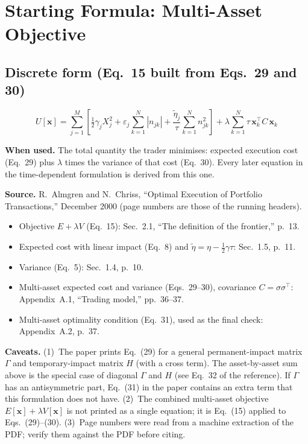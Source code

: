 \documentclass[11pt,a4paper]{article}
\begin{document}
    \section{Starting Formula: Multi-Asset Objective}

    \subsection*{Discrete form (Eq.~15 built from Eqs.~29 and 30)}

    \begin{equation}
    U[\mathbf{x}]
    = \sum_{j=1}^{M}\left[
        \tfrac{1}{2}\gamma_j X_j^2
        + \varepsilon_j \sum_{k=1}^{N}|n_{jk}|
        + \frac{\tilde{\eta}_j}{\tau}\sum_{k=1}^{N} n_{jk}^2
        \right]
    + \lambda \sum_{k=1}^{N} \tau\,\mathbf{x}_k^\top C\,\mathbf{x}_k
    \end{equation}

    \textbf{When used.} The total quantity the trader minimises: expected execution
    cost (Eq.~29) plus $\lambda$ times the variance of that cost (Eq.~30). Every later
    equation in the time-dependent formulation is derived from this one.

    \textbf{Source.} R.~Almgren and N.~Chriss, ``Optimal Execution of Portfolio
    Transactions,'' December 2000 (page numbers are those of the running headers).
    \begin{itemize}[leftmargin=1.5em,nosep]
    \item Objective $E+\lambda V$ (Eq.~15): Sec.~2.1, ``The definition of the frontier,'' p.~13.
    \item Expected cost with linear impact (Eq.~8) and $\tilde\eta=\eta-\tfrac12\gamma\tau$: Sec.~1.5, p.~11.
    \item Variance (Eq.~5): Sec.~1.4, p.~10.
    \item Multi-asset expected cost and variance (Eqs.~29--30), covariance $C=\sigma\sigma^\top$:
            Appendix~A.1, ``Trading model,'' pp.~36--37.
    \item Multi-asset optimality condition (Eq.~31), used as the final check: Appendix~A.2, p.~37.
    \end{itemize}
    \textbf{Caveats.} (1)~The paper prints Eq.~(29) for a general permanent-impact
    matrix $\Gamma$ and temporary-impact matrix $H$ (with a cross term). The
    asset-by-asset sum above is the special case of diagonal $\Gamma$ and $H$ (see
    Eq.~32 of the reference). If $\Gamma$ has an antisymmetric part, Eq.~(31) in the
    paper contains an extra term that this formulation does not have.
    (2)~The combined multi-asset objective $E[\mathbf{x}]+\lambda V[\mathbf{x}]$ is
    not printed as a single equation; it is Eq.~(15) applied to Eqs.~(29)--(30).
    (3)~Page numbers were read from a machine extraction of the PDF; verify them
    against the PDF before citing.
\end{document}

